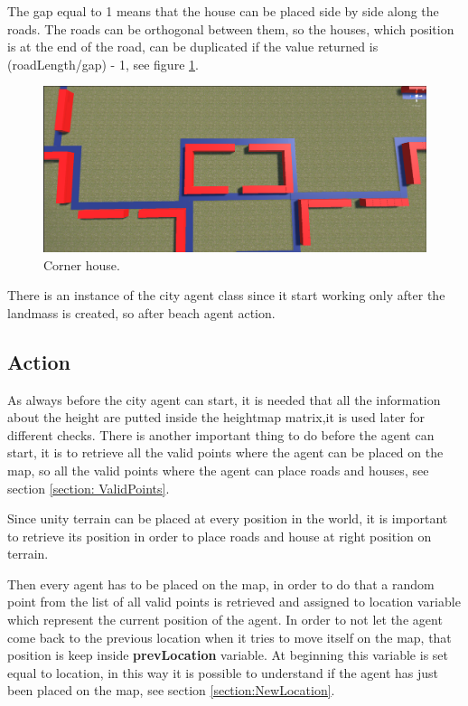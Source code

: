 \documentclass[12pt]{article}
\begin{document}
\begin{itemize}
        The gap equal to 1 means that the house can be placed side by side along the roads. The roads can be orthogonal between them, so the houses, which position is 
        at the end of the road, can be duplicated if the value returned is (roadLength/gap) - 1, see figure \ref{fig:cornerHouse}.
        
        \begin{figure}
            \centering
            \includegraphics[scale = 0.19]{images/Corner house.png}
            \caption{Corner house.}
            \label{fig:cornerHouse}
        \end{figure}
        
    \end{itemize}

    There is an instance of the city agent class since it start working only after the landmass is created, so after beach agent action.

    \subsection{Action} \label{seciton:action}
    As always before the city agent can start, it is needed that all the information about the height are putted inside the heightmap matrix,it is used later
    for different checks. There is another important thing to do before the agent can start, it is to retrieve all the valid points where the agent can be placed on the
    map, so all the valid points where the agent can place roads and houses, see section \ref{section: ValidPoints}.

    Since unity terrain can be placed at every position in the world, it is important to retrieve its position in order to place roads and house at right position on 
    terrain.

    Then every agent has to be placed on the map, in order to do that a random point from the list of all valid points is retrieved and assigned to location variable
    which represent the current position of the agent. In order to not let the agent come back to the previous location when it tries to move itself on the map, that
    position is keep inside \textbf{prevLocation} variable. At beginning this variable is set equal to location, in this way it is possible to understand if the agent
    has just been placed on the map, see section \ref{section:NewLocation}.
\end{document}
